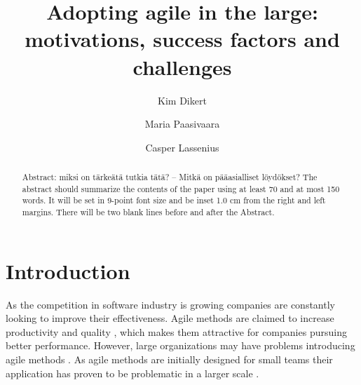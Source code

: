 \documentclass[lnbip]{svmultln}
\begin{document}

\mainmatter


\title{Adopting agile in the large: motivations, success factors and challenges}


\author{Kim Dikert \and Maria Paasivaara \and Casper Lassenius}



\maketitle



\begin{abstract}        %
Abstract: miksi on tärkeätä tutkia tätä?
-- Mitkä on pääasialliset löydökset?
The abstract should summarize the contents of the paper
using at least 70 and at most 150 words. It will be set in 9-point
font size and be inset 1.0 cm from the right and left margins.
There will be two blank lines before and after the Abstract.
\end{abstract}


\section{Introduction}

As the competition in software industry is growing companies are constantly
looking to improve their effectiveness. Agile methods are claimed to increase
productivity and quality , which makes them attractive for
companies pursuing better performance. However, large organizations may have
problems introducing agile methods . As agile methods are
initially designed for small teams their application has proven to be
problematic in a larger scale .
\end{document}
